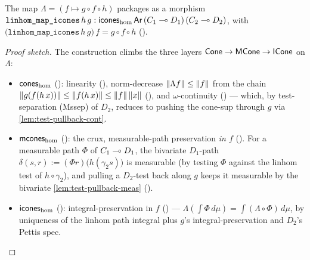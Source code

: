 \begin{lemma}%
\label{lem:linhom-map-icones}
\rocqok
{}
The map $\Lambda = (f \mapsto g \circ f \circ h)$ packages as a
morphism
$\texttt{linhom\_map\_icones}\,h\,g :
\mathsf{icones}_{\mathrm{hom}}\,\mathsf{Ar}\,(C_1 \multimap D_1)\,(C_2 \multimap D_2)$, with
$\bigl(\texttt{linhom\_map\_icones}\,h\,g\bigr)\,f = g \circ f \circ h$
().
\end{lemma}

\begin{proof}[Proof sketch]
The construction climbs the three layers $\mathsf{Cone} \to \mathsf{MCone} \to \mathsf{ICone}$
on $\Lambda$:
\begin{itemize}
  \item \emph{$\mathsf{cones}_{\mathrm{hom}}$}
    (): linearity
    (),
    norm-decrease $\lVert \Lambda f \rVert \le \lVert f \rVert$ from the chain
    $\lVert g(f(h\,x)) \rVert \le \lVert f(h\,x) \rVert \le \lVert f \rVert\,\lVert x \rVert$
    (), and
    $\omega$-continuity
    () ---
    which, by test-separation (Mssep) of $D_2$, reduces to pushing the
    cone-sup through $g$ via
    \autoref{lem:test-pullback-cont}.
  \item \emph{$\mathsf{mcones}_{\mathrm{hom}}$}
    (): the crux,
    measurable-path preservation \emph{in $f$}
    (). For a
    measurable path $\Phi$ of $C_1 \multimap D_1$, the bivariate $D_1$-path
    $\delta(s, r) := (\Phi r)\bigl(h(\gamma_2 s)\bigr)$ is measurable
    (by testing $\Phi$ against the linhom test of $h \circ \gamma_2$),
    and pulling a $D_2$-test back along $g$ keeps it measurable by the
    bivariate
    \autoref{lem:test-pullback-meas}
    ().
  \item \emph{$\mathsf{icones}_{\mathrm{hom}}$}
    ():
    integral-preservation in $f$
    () ---
    $\Lambda(\int \Phi\,d\mu) = \int (\Lambda \circ \Phi)\,d\mu$, by
    uniqueness of the linhom path integral plus $g$'s
    integral-preservation and $D_2$'s Pettis spec.
\end{itemize}
\end{proof}

